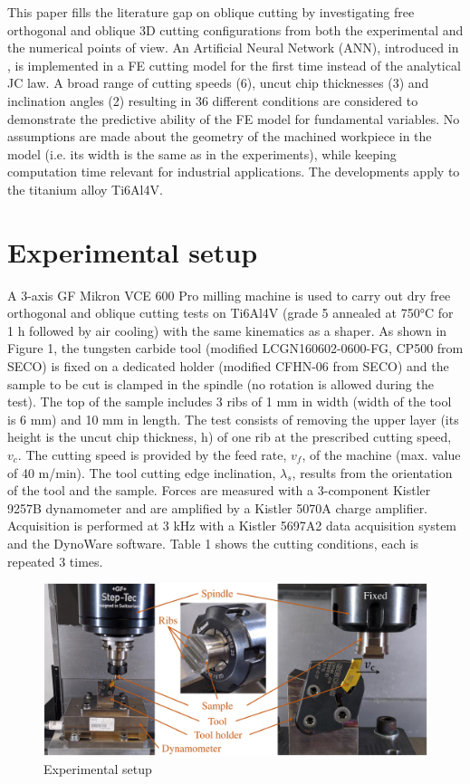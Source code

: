\documentclass[final,5p,times,twocolumn]{elsarticle}
\begin{document}
This paper fills the literature gap on oblique cutting by investigating free orthogonal and oblique 3D cutting configurations from both the experimental and the numerical points of view. An Artificial Neural Network (ANN), introduced in \cite{pantale_efficient_2022}, is implemented in a FE cutting model for the first time instead of the analytical JC law. A broad range of cutting speeds (6), uncut chip thicknesses (3) and inclination angles (2) resulting in 36 different conditions are considered to demonstrate the predictive ability of the FE model for fundamental variables. No assumptions are made about the geometry of the machined workpiece in the model (i.e. its width is the same as in the experiments), while keeping computation time relevant for industrial applications. The developments apply to the titanium alloy Ti6Al4V.

\section{Experimental setup}
\label{ExpSet}

A 3-axis GF Mikron VCE 600 Pro milling machine is used to carry out dry free orthogonal and oblique cutting tests on Ti6Al4V (grade 5 annealed at 750°C for 1 h followed by air cooling) with the same kinematics as a shaper. As shown in Figure 1, the tungsten carbide tool (modified LCGN160602-0600-FG, CP500 from SECO) is fixed on a dedicated holder (modified CFHN-06 from SECO) and the sample to be cut is clamped in the spindle (no rotation is allowed during the test). The top of the sample includes 3 ribs of 1 mm in width (width of the tool is 6 mm) and 10 mm in length. The test consists of removing the upper layer (its height is the uncut chip thickness, h) of one rib at the prescribed cutting speed, $v_c$. The cutting speed is provided by the feed rate, $v_f$, of the machine (max. value of 40 m/min). The tool cutting edge inclination, $\lambda_s$, results from the orientation of the tool and the sample. Forces are measured with a 3-component Kistler 9257B dynamometer and are amplified by a Kistler 5070A charge amplifier. Acquisition is performed at 3 kHz with a Kistler 5697A2 data acquisition system and the DynoWare software. Table 1 shows the cutting conditions, each is repeated 3 times.

\begin{figure}[h]
\centering
\includegraphics{Figures/ExpSetup}
\caption{Experimental setup}
\label{ExpSetup}
\end{figure}
\end{document}
